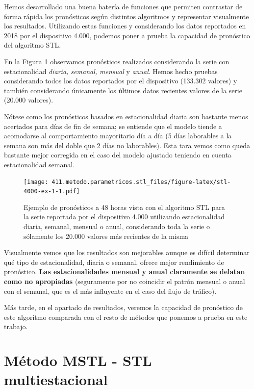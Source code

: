 \documentclass[]{book}
\begin{document}
Hemos desarrollado una buena batería de funciones que permiten
contrastar de forma rápida los pronósticos según distintos algoritmos y
representar visualmente los resultados. Utilizando estas funciones y
considerando los datos reportados en 2018 por el dispositivo 4.000,
podemos poner a prueba la capacidad de pronóstico del algoritmo STL.

En la Figura \ref{fig:stl-4000-ex-1} observamos pronósticos realizados
considerando la serie con estacionalidad \emph{diaria, semanal, mensual}
y \emph{anual}. Hemos hecho pruebas considerando todos los datos
reportados por el dispositivo (133.302 valores) y también considerando
únicamente los últimos datos recientes valores de la serie (20.000
valores).

Nótese como los pronósticos basados en estacionalidad diaria son
bastante menos acertados para días de fin de semana; se entiende que el
modelo tiende a acomodarse al comportamiento mayoritario día a día (5
días laborables a la semana son más del doble que 2 días no laborables).
Esta tara vemos como queda bastante mejor corregida en el caso del
modelo ajustado teniendo en cuenta estacionalidad semanal.

\begin{figure}[htbp]
\centering
\texttt{[image: 411.metodo.parametricos.stl\_files/figure-latex/stl-4000-ex-1-1.pdf]}
\caption{\label{fig:stl-4000-ex-1}Ejemplo de pronósticos a 48 horas vista
con el algoritmo STL para la serie reportada por el dispositivo 4.000
utilizando estacionalidad diaria, semanal, mensual o anual, considerando
toda la serie o sólamente los 20.000 valores más recientes de la misma}
\end{figure}

Visualmente vemos que los resultados son mejorables aunque es difícil
determinar qué tipo de estacionalidad, diaria o semanal, ofrece mejor
rendimiento de pronóstico. \textbf{Las estacionalidades mensual y anual
claramente se delatan como no apropiadas} (seguramente por no coincidir
el patrón mensual o anual con el semanal, que es el más influyente en el
caso del flujo de tráfico).

Más tarde, en el apartado de resultados, veremos la capacidad de
pronóstico de este algoritmo comparada con el resto de métodos que
ponemos a prueba en este trabajo.

\section{Método MSTL - STL
multiestacional}\label{metodo-mstl---stl-multiestacional}
\end{document}
